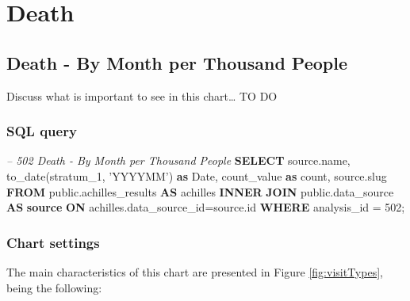 \documentclass[]{book}
\newenvironment{Shaded}{\begin{snugshade}}{\end{snugshade}}
\newcommand{\KeywordTok}[1]{\textcolor[rgb]{0.13,0.29,0.53}{\textbf{#1}}}
\newcommand{\DataTypeTok}[1]{\textcolor[rgb]{0.13,0.29,0.53}{#1}}
\newcommand{\DecValTok}[1]{\textcolor[rgb]{0.00,0.00,0.81}{#1}}
\newcommand{\StringTok}[1]{\textcolor[rgb]{0.31,0.60,0.02}{#1}}
\newcommand{\CommentTok}[1]{\textcolor[rgb]{0.56,0.35,0.01}{\textit{#1}}}
\newcommand{\FunctionTok}[1]{\textcolor[rgb]{0.00,0.00,0.00}{#1}}
\newcommand{\NormalTok}[1]{#1}
\begin{document}
\chapter{Death}\label{death}

\section{Death - By Month per Thousand
People}\label{death---by-month-per-thousand-people}

Discuss what is important to see in this chart\ldots{} TO DO

\subsection{SQL query}\label{sql-query-14}

\begin{Shaded}
\begin{Highlighting}[]
\CommentTok{-- 502  Death - By Month per Thousand People}
\KeywordTok{SELECT}\NormalTok{ source.name,}
       \FunctionTok{to_date}\NormalTok{(stratum_1, }\StringTok{'YYYYMM'}\NormalTok{) }\KeywordTok{as} \DataTypeTok{Date}\NormalTok{,}
\NormalTok{       count_value }\KeywordTok{as} \FunctionTok{count}\NormalTok{, }
\NormalTok{       source.slug}
\KeywordTok{FROM}\NormalTok{ public.achilles_results }\KeywordTok{AS}\NormalTok{ achilles }
    \KeywordTok{INNER} \KeywordTok{JOIN}\NormalTok{ public.data_source }\KeywordTok{AS} \KeywordTok{source} \KeywordTok{ON} 
\NormalTok{      achilles.data_source_id=source.id}
\KeywordTok{WHERE}\NormalTok{ analysis_id = }\DecValTok{502}\NormalTok{;}
\end{Highlighting}
\end{Shaded}

\subsection{Chart settings}\label{chart-settings-14}

The main characteristics of this chart are presented in Figure
\ref{fig:visitTypes}, being the following:
\end{document}
